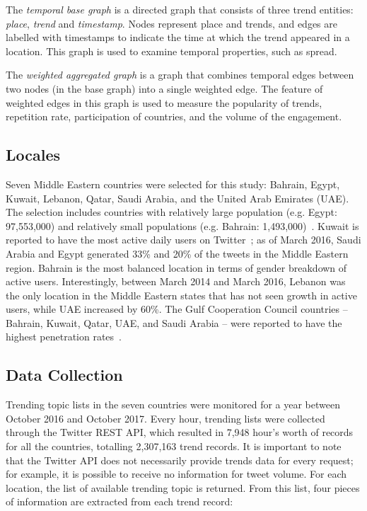 \documentclass{llncs}
\begin{document}
The {\emph{temporal base graph}} is a directed graph that consists of
three trend entities: {\emph{place}}, {\emph{trend}} and
{\emph{timestamp}}. Nodes represent place and trends, and edges are
labelled with timestamps to indicate the time at which the trend
appeared in a location. This graph is used to examine temporal
properties, such as spread.

The {\emph{weighted aggregated graph}} is a graph that combines
temporal edges between two nodes (in the base graph) into a single
weighted edge. The feature of weighted edges in this graph is used to
measure the popularity of trends, repetition rate, participation of
countries, and the volume of the engagement.

\subsection{Locales}

Seven Middle Eastern countries were selected for this study: Bahrain,
Egypt, Kuwait, Lebanon, Qatar, Saudi Arabia, and the United Arab
Emirates (UAE). The selection includes countries with relatively large
population (e.g. Egypt: 97,553,000) and relatively small populations
(e.g. Bahrain:
1,493,000)~\cite{UnitedNationsDepartmentofEconomicandSocialAffairs2017}.
Kuwait is reported to have the most active daily users on
Twitter~\cite{Salem2017}; as of March 2016, Saudi Arabia and Egypt
generated 33\% and 20\% of the tweets in the Middle Eastern
region. Bahrain is the most balanced location in terms of gender
breakdown of active users. Interestingly, between March 2014 and March
2016, Lebanon was the only location in the Middle Eastern states that
has not seen growth in active users, while UAE increased by 60\%. The
Gulf Cooperation Council countries -- Bahrain, Kuwait, Qatar, UAE, and
Saudi Arabia -- were reported to have the highest penetration
rates~\cite{Salem2017}.

\subsection{Data Collection}

Trending topic lists in the seven countries were monitored for a year
between October 2016 and October 2017. Every hour, trending lists were
collected through the Twitter REST API, which resulted in 7,948 hour's
worth of records for all the countries, totalling 2,307,163 trend
records. It is important to note that the Twitter API does not
necessarily provide trends data for every request; for example, it is
possible to receive no information for tweet volume. For each
location, the list of available trending topic is returned. From this
list, four pieces of information are extracted from each trend record:
\end{document}
